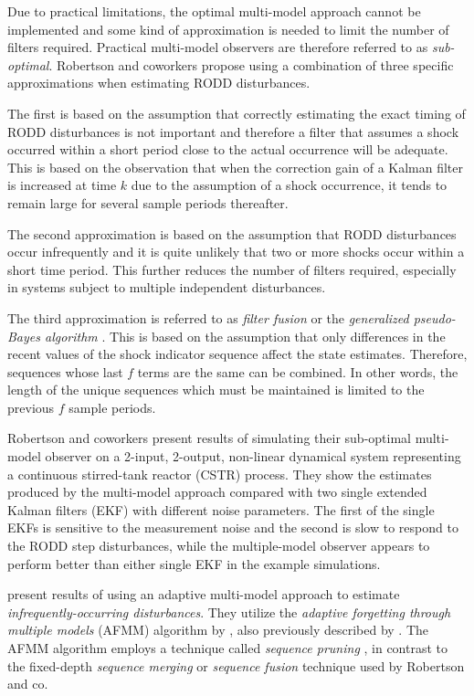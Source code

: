 Due to practical limitations, the optimal multi-model approach cannot be implemented and some kind of approximation is needed to limit the number of filters required. Practical multi-model observers are therefore referred to as \textit{sub-optimal}. Robertson and coworkers propose using a combination of three specific approximations when estimating RODD disturbances.

The first is based on the assumption that correctly estimating the exact timing of RODD disturbances is not important and therefore a filter that assumes a shock occurred within a short period close to the actual occurrence will be adequate. This is based on the observation that when the correction gain of a Kalman filter is increased at time $k$ due to the assumption of a shock occurrence, it tends to remain large for several sample periods thereafter.

The second approximation is based on the assumption that RODD disturbances occur infrequently and it is quite unlikely that two or more shocks occur within a short time period. This further reduces the number of filters required, especially in systems subject to multiple independent disturbances.

The third approximation is referred to as \textit{filter fusion} or the \textit{generalized pseudo-Bayes algorithm} \cite{jaffer_estimation_1971, buxbaum_recursive_1970, tugnait_detection_1982}. This is based on the assumption that only differences in the recent values of the shock indicator sequence affect the state estimates. Therefore, sequences whose last $f$ terms are the same can be combined. In other words, the length of the unique sequences which must be maintained is limited to the previous $f$ sample periods.

Robertson and coworkers present results of simulating their sub-optimal multi-model observer on a 2-input, 2-output, non-linear dynamical system representing a continuous stirred-tank reactor (CSTR) process. They show the estimates produced by the multi-model approach compared with two single extended Kalman filters (EKF) with different noise parameters. The first of the single EKFs is sensitive to the measurement noise and the second is slow to respond to the RODD step disturbances, while the multiple-model observer appears to perform better than either single EKF in the example simulations.

\cite{eriksson_classification_1996} present results of using an adaptive multi-model approach to estimate \textit{infrequently-occurring disturbances}. They utilize the \textit{adaptive forgetting through multiple models} (AFMM) algorithm by \cite{andersson_adaptive_1985}, also previously described by \cite{gustafsson_estimation_1993}. The AFMM algorithm employs a technique called \textit{sequence pruning} \cite{tugnait_detection_1982}, in contrast to the fixed-depth \textit{sequence merging} or \textit{sequence fusion} technique \citep{blom_interacting_1988} used by Robertson and co.

